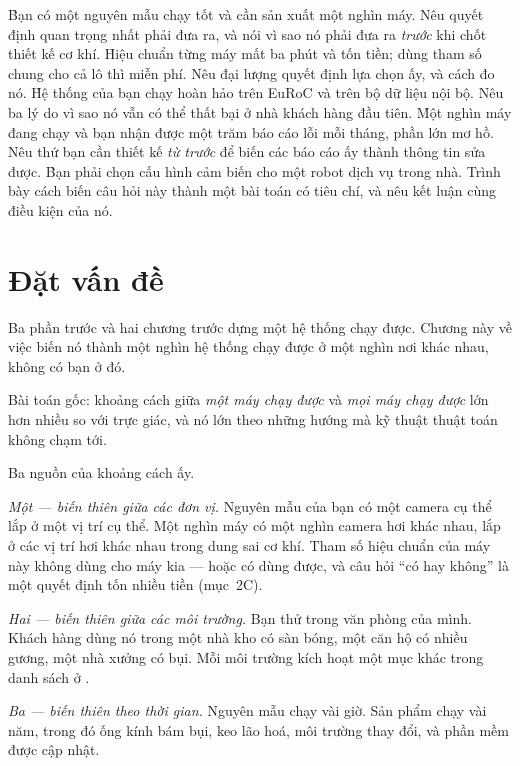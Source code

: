 \documentclass[../../vslam.tex]{subfiles}
\begin{document}
\begin{khoigoi}
\h{Bạn có một nguyên mẫu chạy tốt và cần sản xuất một nghìn máy. Nêu quyết định quan trọng nhất phải đưa ra, và nói vì sao nó phải đưa ra \emph{trước} khi chốt thiết kế cơ khí.}
\h{Hiệu chuẩn từng máy mất ba phút và tốn tiền; dùng tham số chung cho cả lô thì miễn phí. Nêu đại lượng quyết định lựa chọn ấy, và cách đo nó.}
\h{Hệ thống của bạn chạy hoàn hảo trên EuRoC và trên bộ dữ liệu nội bộ. Nêu ba lý do vì sao nó vẫn có thể thất bại ở nhà khách hàng đầu tiên.}
\h{Một nghìn máy đang chạy và bạn nhận được một trăm báo cáo lỗi mỗi tháng, phần lớn mơ hồ. Nêu thứ bạn cần thiết kế \emph{từ trước} để biến các báo cáo ấy thành thông tin sửa được.}
\h{Bạn phải chọn cấu hình cảm biến cho một robot dịch vụ trong nhà. Trình bày cách biến câu hỏi này thành một bài toán có tiêu chí, và nêu kết luận cùng điều kiện của nó.}
\end{khoigoi}

\section{Đặt vấn đề}

Ba phần trước và hai chương trước dựng một hệ thống chạy được. Chương này về việc biến nó thành một nghìn hệ thống chạy được ở một nghìn nơi khác nhau, không có bạn ở đó.

Bài toán gốc: khoảng cách giữa \emph{một máy chạy được} và \emph{mọi máy chạy được} lớn hơn nhiều so với trực giác, và nó lớn theo những hướng mà kỹ thuật thuật toán không chạm tới.

Ba nguồn của khoảng cách ấy.

\emph{Một --- biến thiên giữa các đơn vị.} Nguyên mẫu của bạn có một camera cụ thể lắp ở một vị trí cụ thể. Một nghìn máy có một nghìn camera hơi khác nhau, lắp ở các vị trí hơi khác nhau trong dung sai cơ khí. Tham số hiệu chuẩn của máy này không dùng cho máy kia --- hoặc có dùng được, và câu hỏi ``có hay không'' là một quyết định tốn nhiều tiền (mục~2C).

\emph{Hai --- biến thiên giữa các môi trường.} Bạn thử trong văn phòng của mình. Khách hàng dùng nó trong một nhà kho có sàn bóng, một căn hộ có nhiều gương, một nhà xưởng có bụi. Mỗi môi trường kích hoạt một mục khác trong danh sách ở .

\emph{Ba --- biến thiên theo thời gian.} Nguyên mẫu chạy vài giờ. Sản phẩm chạy vài năm, trong đó ống kính bám bụi, keo lão hoá, môi trường thay đổi, và phần mềm được cập nhật.
\end{document}
